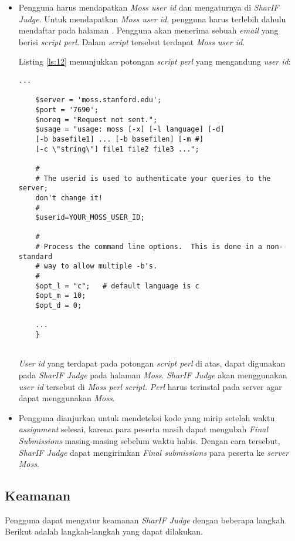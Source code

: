 \begin{itemize}
	\item Pengguna harus mendapatkan \textit{Moss user id} dan mengaturnya di \textit{SharIF Judge}. Untuk mendapatkan \textit{Moss user id}, pengguna harus terlebih dahulu mendaftar pada halaman . Pengguna akan menerima sebuah \textit{email} yang berisi \textit{script perl}. Dalam \textit{script} tersebut terdapat \textit{Moss user id}.
	
	Listing \ref{ls:12} menunjukkan potongan \textit{script perl} yang mengandung \textit{user id}:
	\begin{lstlisting}[basicstyle=\ttfamily, frame=single,
	columns=fullflexible, keepspaces=true, breaklines=true, label=ls:12, caption=Potongan \textit{script perl}]
	...
	
	$server = 'moss.stanford.edu';
	$port = '7690';
	$noreq = "Request not sent.";
	$usage = "usage: moss [-x] [-l language] [-d] 
	[-b basefile1] ... [-b basefilen] [-m #] 
	[-c \"string\"] file1 file2 file3 ...";
	
	#
	# The userid is used to authenticate your queries to the server; 
	don't change it!
	#
	$userid=YOUR_MOSS_USER_ID;
	
	#
	# Process the command line options.  This is done in a non-standard
	# way to allow multiple -b's.
	#
	$opt_l = "c";   # default language is c
	$opt_m = 10;
	$opt_d = 0;
	
	...
	}
	
	\end{lstlisting}
	
	\textit{User id} yang terdapat pada potongan \textit{script perl} di atas, dapat digunakan pada \textit{SharIF Judge} pada halaman \textit{Moss}. \textit{SharIF Judge} akan menggunakan \textit{user id} tersebut di \textit{Moss perl script}. \textit{Perl} harus terinstal pada server agar dapat menggunakan \textit{Moss}.  
	
	\item Pengguna dianjurkan untuk mendeteksi kode yang mirip setelah waktu \textit{assignment} selesai, karena para peserta masih dapat mengubah \textit{Final Submissions} masing-masing sebelum waktu habis. Dengan cara tersebut, \textit{SharIF Judge} dapat mengirimkan \textit{Final submissions} para peserta ke \textit{server Moss}.
\end{itemize}

\subsection{Keamanan}
\label{sec:keamanan}
Pengguna dapat mengatur keamanan \textit{SharIF Judge} dengan beberapa langkah. Berikut adalah langkah-langkah yang dapat dilakukan.

